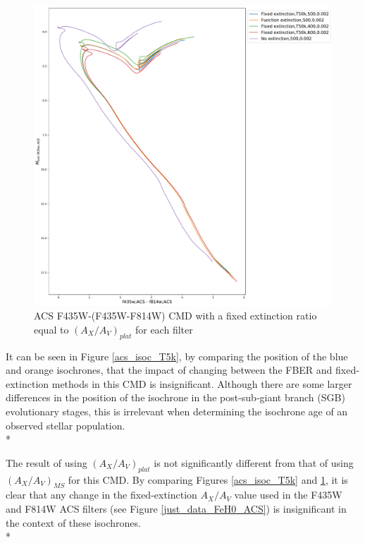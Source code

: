 \documentclass[12pt, a4paper]{report}
\begin{document}
\begin{figure}[h!]
\begin{center}
\includegraphics[width=1.0\textwidth]{../basti_isochrones_10_13Gyr/Extinction_T50k_FeH0fix_func_f435wACS_f435wACSmf814wACS_500_400_600_Myr_FeH_0p002_ref_noext_Av_1p0.pdf}
\caption{ACS F435W-(F435W-F814W) CMD with a fixed extinction ratio equal to $(A_{X}/A_{V})_{plat}$ for each filter}
\label{acs_isoc_T50k}
\end{center}
\end{figure}

It can be seen in Figure \ref{acs_isoc_T5k}, by comparing the position of the blue and orange isochrones, that the impact of changing between the FBER and fixed-extinction methods in this CMD is insignificant. Although there are some larger differences in the position of the isochrone in the post-sub-giant branch (SGB) evolutionary stages, this is irrelevant when determining the isochrone age of an observed stellar population.\\*

The result of using $(A_{X}/A_{V})_{plat}$ is not significantly different from that of using $(A_{X}/A_{V})_{MS}$ for this CMD. By comparing Figures \ref{acs_isoc_T5k} and \ref{acs_isoc_T50k}, it is clear that any change in the fixed-extinction $A_{X}/A_{V}$ value used in the F435W and F814W ACS filters (see Figure \ref{just_data_FeH0_ACS}) is insignificant in the context of these isochrones.\\*
\end{document}
